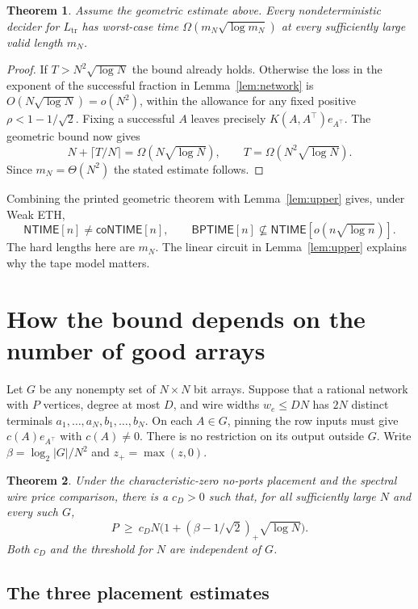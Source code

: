 \documentclass[11pt]{article}
\newtheorem{theorem}{Theorem}[section]
\newcommand{\TrLang}{L_{\mathrm{tr}}}
\newcommand{\NT}{\mathsf{NTIME}}
\newcommand{\coNT}{\mathsf{coNTIME}}
\begin{document}
\begin{theorem}\label{thm:tape}
Assume the geometric estimate above. Every nondeterministic decider
for $\TrLang$ has worst-case time $\Omega(m_N\sqrt{\log m_N})$ at
every sufficiently large valid length $m_N$.
\end{theorem}
\begin{proof}
If $T>N^2\sqrt{\log N}$ the bound already holds. Otherwise the loss
in the exponent of the successful fraction in Lemma~\ref{lem:network}
is $O(N\sqrt{\log N})=o(N^2)$, within the allowance for any fixed
positive $\rho<1-1/\sqrt2$. Fixing a successful $A$ leaves precisely
$K(A,A^\top)e_{A^\top}$. The geometric bound now gives
\[
 N+\lceil T/N\rceil=\Omega(N\sqrt{\log N}),
 \qquad T=\Omega(N^2\sqrt{\log N}).
\]
Since $m_N=\Theta(N^2)$ the stated estimate follows.
\end{proof}

Combining the printed geometric theorem with Lemma~\ref{lem:upper}
gives, under Weak ETH,
\[
 \NT[n]\ne\coNT[n],\qquad
 \mathsf{BPTIME}[n]\not\subseteq\NT[o(n\sqrt{\log n})].
\]
The hard lengths here are $m_N$. The linear circuit in Lemma~\ref{lem:upper}
explains why the tape model matters.

\section{How the bound depends on the number of good arrays}\label{sec:audit}

Let $G$ be any nonempty set of $N\times N$ bit arrays. Suppose that a
rational network with $P$ vertices, degree at most $D$, and wire widths
$w_e\le DN$ has $2N$ distinct terminals $a_1,\ldots,a_N,b_1,\ldots,b_N$.
On each $A\in G$, pinning the row inputs must give
$c(A)e_{A^\top}$ with $c(A)\ne0$. There is no restriction on its output
outside $G$. Write $\beta=\log_2|G|/N^2$ and $z_+=\max(z,0)$.

\begin{theorem}\label{thm:density}
Under the characteristic-zero no-ports placement and the spectral wire
price comparison, there is a $c_D>0$ such that, for all sufficiently
large $N$ and every such $G$,
\[
       P\ \ge\ c_D N\bigl(1+(\beta-1/\sqrt2)_+\sqrt{\log N}\bigr).
\]
Both $c_D$ and the threshold for $N$ are independent of $G$.
\end{theorem}

\subsection{The three placement estimates}
\end{document}
